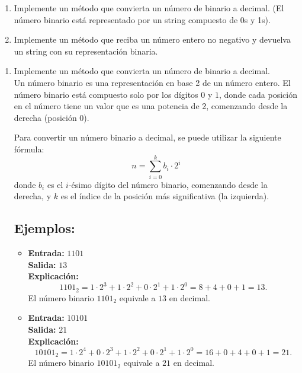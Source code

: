 \begin{enumerate}[label=\alph*)]
    \item Implemente un método que convierta un número de binario a decimal. (El número binario está representado por un string compuesto de 0s y 1s).
    \item Implemente un método que reciba un número entero no negativo y devuelva un string con su representación binaria.
\end{enumerate}

\begin{enumerate}[label=\alph*)]
    \item Implemente un método que convierta un número de binario a decimal.\\
    Un número binario es una representación en base 2 de un número entero. El número binario está compuesto solo por los dígitos \(0\) y \(1\), donde cada posición en el número tiene un valor que es una potencia de 2, comenzando desde la derecha (posición 0).

    Para convertir un número binario a decimal, se puede utilizar la siguiente fórmula:
    \[
    n = \sum_{i=0}^{k} b_i \cdot 2^i
    \]
    donde \(b_i\) es el \(i\)-ésimo dígito del número binario, comenzando desde la derecha, y \(k\) es el índice de la posición más significativa (la izquierda).

    \subsection*{Ejemplos:}
    \begin{itemize}
        \item \textbf{Entrada:} \( \text{1101} \) \\
        \textbf{Salida:} \( 13 \) \\
        \textbf{Explicación:}
        \[
        1101_2 = 1 \cdot 2^3 + 1 \cdot 2^2 + 0 \cdot 2^1 + 1 \cdot 2^0 = 8 + 4 + 0 + 1 = 13.
        \]
        El número binario \(1101_2\) equivale a \(13\) en decimal.

        \item \textbf{Entrada:} \( \text{10101} \) \\
        \textbf{Salida:} \( 21 \) \\
        \textbf{Explicación:}
        \[
        10101_2 = 1 \cdot 2^4 + 0 \cdot 2^3 + 1 \cdot 2^2 + 0 \cdot 2^1 + 1 \cdot 2^0 = 16 + 0 + 4 + 0 + 1 = 21.
        \]
        El número binario \(10101_2\) equivale a \(21\) en decimal.
    \end{itemize}


\end{enumerate}
